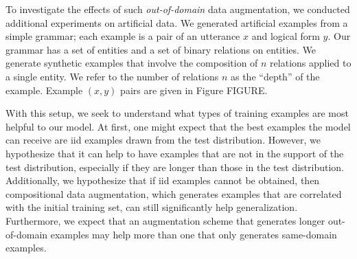 \documentclass[11pt,letterpaper]{article}
\begin{document}
To investigate the effects of such \emph{out-of-domain} data augmentation,
we conducted additional experiments on artificial data.
We generated artificial examples from a simple grammar;
each example is a pair of an utterance $x$ and logical form $y$.
Our grammar has a set of entities and a set of binary relations on entities.
We generate synthetic examples that involve the 
composition of $n$ relations applied to a single entity.
We refer to the number of relations $n$ as the ``depth'' of the example.
Example $(x, y)$ pairs are given in Figure FIGURE.

With this setup, we seek to understand what types of training examples 
are most helpful to our model.
At first, one might expect that the best examples the model can receive
are iid examples drawn from the test distribution.
However, we hypothesize that it can help to have examples
that are not in the support of the test distribution, 
especially if they are longer than those in the test distribution.
Additionally, we hypothesize that if iid examples cannot be obtained,
then compositional data augmentation, 
which generates examples that are correlated
with the initial training set, can still significantly help generalization.
Furthermore, we expect that an augmentation scheme that generates
longer out-of-domain examples may help more than one that only generates
same-domain examples.
\end{document}
